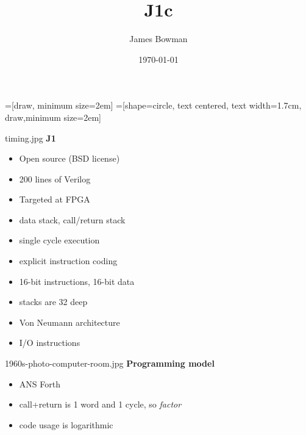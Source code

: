 \documentclass[compress,mathserif]{beamer}
\begin{document}
\title{J1c}   
\author{James Bowman} 
\date{\today} 

\frame{\titlepage} 

=[draw, minimum size=2em]
=[shape=circle, text centered, text width=1.7cm, draw,minimum size=2em]
\everymath{\displaystyle}

\begin{imageframe}{timing.jpg}
  {\bf\Huge J1}
\end{imageframe}

\begin{frame}
\begin{itemize}
   \item Open source (BSD license)
   \item 200 lines of Verilog
   \item Targeted at FPGA
\end{itemize}
\end{frame}

\begin{frame}
\begin{itemize}
   \item data stack, call/return stack
   \item single cycle execution
   \item explicit instruction coding
\end{itemize}
\end{frame}

\begin{frame}
\begin{itemize}
   \item 16-bit instructions, 16-bit data
   \item stacks are 32 deep
   \item Von Neumann architecture
   \item I/O instructions
\end{itemize}
\end{frame}

\begin{imageframe}{1960s-photo-computer-room.jpg}
  {\bf\Huge Programming model}
\end{imageframe}

\begin{frame}
\begin{itemize}
   \item ANS Forth
   \item call+return is 1 word and 1 cycle, so \textit{factor}
   \item code usage is logarithmic
\end{itemize}
\end{frame}
\end{document}
